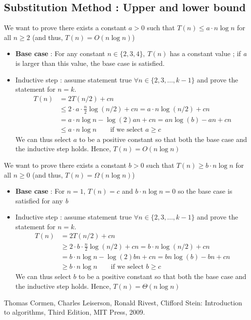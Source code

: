 \documentclass[12pt,twoside,a4paper]{article}
\begin{document}
\subsection{Substitution Method : Upper and lower bound}\label{appendix: substitution method}
 We want to prove there exists a constant $a > 0$ such that $T(n) \leq a \cdot n\log n$ for all $n \geq 2$ (and thus, $T(n) = O(n\log n)$)
\begin{itemize}
	\item 	\textbf{Base case} : For any constant $n \in \{2,3,4\},\ T(n)$ has a constant value ; if \textit{a} is larger than this value, the base case is satisfied.
	\item 	Inductive step : assume statement true $\forall n \in \{2,3,...,k-1\}$ and prove the statement for $n=k$.
	\[\begin{array}{rl}
		T(n) &= 2T(n/2) + cn\\
		&\leq 2 \cdot a \cdot \frac{n}{2} \log(n/2) + cn = a\cdot n\log(n/2) + cn\\
		&= a \cdot n\log n - \log(2)an + cn = an\log(b) - an + cn\\
		&\leq a\cdot n\log n \qquad \text{if we select } a\geq c
	\end{array}
	\]
	We can thus select $a$ to be a positive constant so that both the base case and the inductive step holds. Hence, $T(n) = O(n\log n)$
\end{itemize}
 We want to prove there exists a constant $b > 0$ such that $T(n) \geq b \cdot n\log n$ for all $n \geq 0$ (and thus, $T(n) = \Omega(n\log n)$)
\begin{itemize}
	\item 	\textbf{Base case} : For $n=1$, $T(n) = c$ and $b \cdot n \log n = 0$ so the base case is satisfied for any \textit{b}
	\item 	Inductive step : assume statement true $\forall n \in \{2,3,...,k-1\}$ and prove the statement for $n=k$.
	\[\begin{array}{rl}
		T(n) &= 2T(n/2) + cn\\
		&\geq 2 \cdot b \cdot \frac{n}{2} \log(n/2) + cn = b \cdot n\log(n/2) + cn\\
		&= b \cdot n\log n - \log(2)bn + cn = bn\log(b) - bn + cn\\
		&\geq b\cdot n\log n \qquad \text{if we select } b \geq c
	\end{array}
	\]
	We can thus select $b$ to be a positive constant so that both the base case and the inductive step holds. Hence, $T(n) = \Theta(n\log n)$
\end{itemize}
\newpage
\begin{thebibliography}{10}
	 Thomas Cormen, Charles Leiserson, Ronald Rivest, Clifford Stein: Introduction to algorithms, Third Edition, MIT Press, 2009.
\end{thebibliography}
\end{document}
